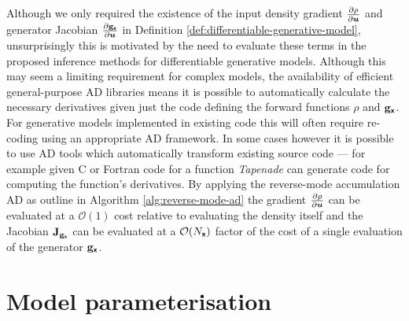 Although we only required the existence of the input density gradient $\frac{\partial \rho}{\partial \boldsymbol{u}}$ and generator Jacobian $\frac{\partial {\mathbf{g}}_{\boldsymbol{\mathsf{x}}}}{\partial \boldsymbol{u}}$ in Definition \ref{def:differentiable-generative-model}, unsurprisingly this is motivated by the need to evaluate these terms in the proposed inference methods for differentiable generative models. Although this may seem a limiting requirement for complex models, the availability of efficient general-purpose \ac{AD} libraries \citep{baydin2015automatic} means it is possible to automatically calculate the necessary derivatives given just the code defining the forward functions $\rho$ and ${\mathbf{g}}_{\boldsymbol{\mathsf{x}}}$. For generative models implemented in existing code this will often require re-coding using an appropriate \ac{AD} framework. In some cases however it is possible to use \ac{AD} tools which automatically transform existing source code --- for example given C or Fortran code for a function \emph{Tapenade} \citep{hascoet2013tapenade} can generate code for computing the function's derivatives. By applying the reverse-mode accumulation \ac{AD} as outline in Algorithm \ref{alg:reverse-mode-ad} the gradient $\frac{\partial \rho}{\partial \boldsymbol{u}}$  can be evaluated at a $\mathcal{O}(1)$ cost relative to evaluating the density itself and the Jacobian $\mathbf{J}_{{\mathbf{g}}_{\boldsymbol{\mathsf{x}}}}$ can be evaluated at a $\mathcal{O}(N_{\boldsymbol{\mathsf{x}}})$ factor of the cost of a single evaluation of the generator ${\mathbf{g}}_{\boldsymbol{\mathsf{x}}}$.


\section{Model parameterisation}\label{sec:model-parameterisation}

